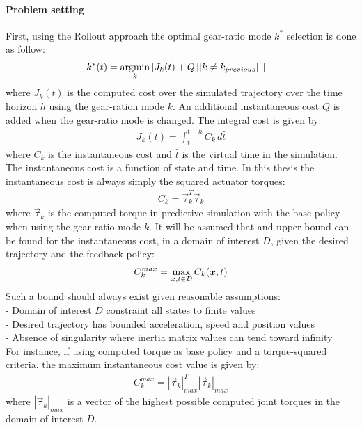 \paragraph{Problem setting}
First, using the Rollout approach the optimal gear-ratio mode $k^*$ selection is done as follow:
%
\begin{align}
k^*(t)   &= \operatornamewithlimits{argmin}\limits_{k} \left[ J_k(t) + Q \, [[ k \neq k_{previous}]] \, \right]
\label{eq:rolloutsimple}
\end{align}
%
where $J_k(t)$ is the computed cost over the simulated trajectory over the time horizon $h$ using the gear-ration mode $k$. An additional instantaneous cost $Q$ is added when the gear-ratio mode is changed.
%
The integral cost is given by:
%
\begin{align}
J_k(t) = \int_{t}^{t+h}{  C_k \, d\hat{t} }
\end{align}
%
where $C_k$ is the instantaneous cost and $\hat{t}$ is the virtual time in the simulation. The instantaneous cost is a function of state and time. In this thesis the instantaneous cost is always simply the squared actuator torques:
%
\begin{align}
C_k =  \vec{\tau}_k^T \vec{\tau}_k
\end{align}
%
where $\vec{\tau}_k$ is the computed torque in predictive simulation with the base policy when using the gear-ratio mode $k$.
%
It will be assumed that and upper bound can be found for the instantaneous cost, in a domain of interest $D$, given the desired trajectory and the feedback policy:
%
\begin{align}
C_k^{max} =  \operatornamewithlimits{max}\limits_{\vec{x},t \in D} C_k(\vec{x},t)
\end{align}
%
Such a bound should always exist given reasonable assumptions:                  \\
- Domain of interest $D$ constraint all states to finite values                 \\
- Desired trajectory has bounded acceleration, speed and position values        \\
- Absence of singularity where inertia matrix values can tend toward infinity   \\

For instance, if using computed torque as base policy and a torque-squared criteria, the maximum instantaneous cost value is given by:
%
\begin{align}
C_k^{max} =  |\vec{\tau}_{k}|_{max}^T |\vec{\tau}_{k}|_{max}
\end{align}
%
where $|\vec{\tau}_{k}|_{max}$ is a vector of the highest possible computed joint torques in the domain of interest $D$.


